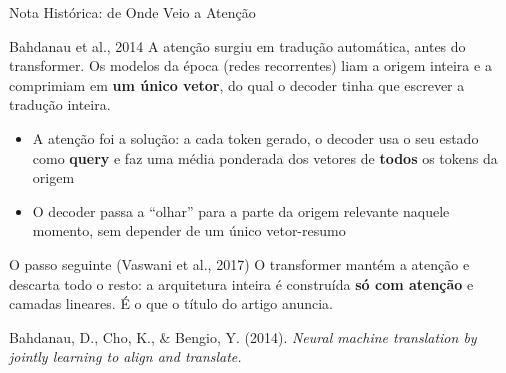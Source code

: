 \documentclass[aspectratio=169,xcolor=dvipsnames]{beamer}
\begin{document}
\begin{frame}{Nota Histórica: de Onde Veio a Atenção}

\begin{block}{Bahdanau et al., 2014}
A atenção surgiu em tradução automática, antes do transformer. Os modelos da época (redes recorrentes) liam a origem inteira e a comprimiam em \textbf{um único vetor}, do qual o decoder tinha que escrever a tradução inteira.
\end{block}

\vspace{6pt}

\begin{itemize}
    \item A atenção foi a solução: a cada token gerado, o decoder usa o seu estado como \textbf{query} e faz uma média ponderada dos vetores de \textbf{todos} os tokens da origem
    \item O decoder passa a ``olhar'' para a parte da origem relevante naquele momento, sem depender de um único vetor-resumo
\end{itemize}

\vspace{6pt}

\begin{exampleblock}{O passo seguinte (Vaswani et al., 2017)}
O transformer mantém a atenção e descarta todo o resto: a arquitetura inteira é construída \textbf{só com atenção} e camadas lineares. É o que o título do artigo anuncia.
\end{exampleblock}

\vspace{2pt}
\centering
\footnotesize Bahdanau, D., Cho, K., \& Bengio, Y. (2014). \textit{Neural machine translation by jointly learning to align and translate.}

\end{frame}

\end{document}
